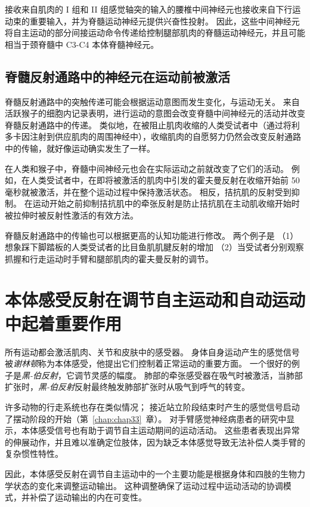 接收来自肌肉的 I 组和 II 组感觉轴突的输入的腰椎中间神经元也接收来自下行运动束的重要输入，并为脊髓运动神经元提供兴奋性投射。
因此，这些中间神经元将自主运动的部分间接运动命令传递给控制腿部肌肉的脊髓运动神经元，并且可能相当于颈脊髓中 C3-C4 本体脊髓神经元。



\subsection{脊髓反射通路中的神经元在运动前被激活}

脊髓反射通路中的突触传递可能会根据运动意图而发生变化，与运动无关。
来自活跃猴子的细胞内记录表明，进行运动的意图会改变脊髓中间神经元的活动并改变脊髓反射通路中的传递。
类似地，在被阻止肌肉收缩的人类受试者中（通过将利多卡因注射到供应肌肉的周围神经中），收缩肌肉的自愿努力仍然会改变反射通路中的传输，就好像运动确实发生了一样。


在人类和猴子中，脊髓中间神经元也会在实际运动之前就改变了它们的活动。
例如，在人类受试者中，在即将被激活的肌肉中引发的霍夫曼反射在收缩开始前 50 毫秒就被激活，并在整个运动过程中保持激活状态。
相反，拮抗肌的反射受到抑制。
在运动开始之前抑制拮抗肌中的牵张反射是防止拮抗肌在主动肌收缩开始时被拉伸时被反射性激活的有效方法。


脊髓反射通路中的传输也可以根据更高的认知功能进行修改。
两个例子是
（1） 想象踩下脚踏板的人类受试者的比目鱼肌肌腱反射的增加 
（2）当受试者分别观察抓握和行走运动时手臂和腿部肌肉的霍夫曼反射的调节。



\section{本体感受反射在调节自主运动和自动运动中起着重要作用}

所有运动都会激活肌肉、关节和皮肤中的感受器。
身体自身运动产生的感觉信号被\textit{谢林顿}称为本体感受，他提出它们控制着正常运动的重要方面。
一个很好的例子是\textit{黑-伯反射}，它调节灵感的幅度。
肺部的牵张感受器在吸气时被激活，当肺部扩张时，\textit{黑-伯反射}反射最终触发肺部扩张时从吸气到呼气的转变。


许多动物的行走系统也存在类似情况；
接近站立阶段结束时产生的感觉信号启动了摆动阶段的开始（第~\ref{chap:chap33}~章）。
对手臂感觉神经病患者的研究中显示，本体感受信号也有助于调节自主运动期间的运动活动。
这些患者表现出异常的伸展动作，并且难以准确定位肢体，因为缺乏本体感觉导致无法补偿人类手臂的复杂惯性特性。


因此，本体感受反射在调节自主运动中的一个主要功能是根据身体和四肢的生物力学状态的变化来调整运动输出。
这种调整确保了运动过程中运动活动的协调模式，并补偿了运动输出的内在可变性。



